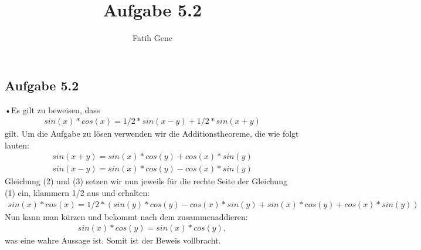 \documentclass[10pt,a4paper]{article}
\author{Fatih Genc}
\title{Aufgabe 5.2}
\begin{document}
\subsection{Aufgabe 5.2}
•Es gilt zu beweisen, dass 
\begin{align}
sin(x)*cos(x)= 1/2*sin(x-y)+1/2*sin(x+y)
\end{align}
gilt. Um die Aufgabe zu lösen verwenden wir die Additionstheoreme, die wie folgt lauten:
\begin{align}
sin(x+y)=sin(x)*cos(y)+cos(x)*sin(y)
\end{align}
\begin{align}
sin(x-y)=sin(x)*cos(y)-cos(x)*sin(y)
\end{align}
Gleichung (2) und (3) setzen wir nun jeweils für die rechte Seite der Gleichung (1) ein, klammern 1/2 aus und erhalten: 
\begin{align}
sin(x)*cos(x)= 1/2*(sin(y)*cos(y)-cos(x)*sin(y)+sin(x)*cos(y)+cos(x)*sin(y))
\end{align} 
Nun kann man kürzen und bekommt nach dem zusammenaddieren:
\begin{align}
sin(x)*cos(y)=sin(x)*cos(y),
\end{align}
was eine wahre Aussage ist. Somit ist der Beweis vollbracht.
\end{document}
